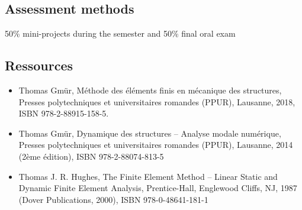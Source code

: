 \documentclass[11pt]{amsart}
\begin{document}
\subsection*{Assessment methods}
50\% mini-projects during the semester and 50\% final oral exam

\subsection*{Ressources}
\begin{itemize}
\item Thomas Gmür, Méthode des éléments finis en mécanique des structures, Presses polytechniques et universitaires romandes (PPUR), Lausanne, 2018, ISBN 978-2-88915-158-5. 
\item Thomas Gmür, Dynamique des structures – Analyse modale numérique, Presses polytechniques et universitaires romandes (PPUR), Lausanne, 2014 (2ème édition), ISBN 978-2-88074-813-5
\item Thomas J. R. Hughes, The Finite Element Method – Linear Static and Dynamic Finite Element Analysis, Prentice-Hall, Englewood Cliffs, NJ, 1987 (Dover Publications, 2000), ISBN 978-0-48641-181-1
\end{itemize}
\end{document}

